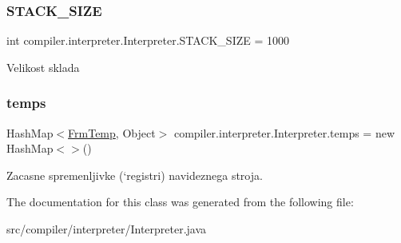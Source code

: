 \subsubsection{\texorpdfstring{S\+T\+A\+C\+K\+\_\+\+S\+I\+ZE}{STACK\_SIZE}}
{\footnotesize\ttfamily int compiler.\+interpreter.\+Interpreter.\+S\+T\+A\+C\+K\+\_\+\+S\+I\+ZE = 1000\hspace{0.3cm}{\ttfamily [static]}}

Velikost sklada \mbox{\label{classcompiler_1_1interpreter_1_1_interpreter_afe4c853bb7246ff653b136d1e522f704}} 
\subsubsection{\texorpdfstring{temps}{temps}}
{\footnotesize\ttfamily Hash\+Map$<$\hyperlink{classcompiler_1_1frames_1_1_frm_temp}{Frm\+Temp}, Object$>$ compiler.\+interpreter.\+Interpreter.\+temps = new Hash\+Map$<$$>$()}

Zacasne spremenljivke (`registri\textquotesingle{}) navideznega stroja. 

The documentation for this class was generated from the following file\+:\begin{DoxyCompactItemize}
\item 
src/compiler/interpreter/Interpreter.\+java\end{DoxyCompactItemize}
